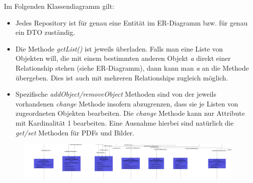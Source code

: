 {Im Folgenden Klassendiagramm gilt:
\begin{itemize}
	\item Jedes Repository ist für genau eine Entität im ER-Diagramm bzw. für genau ein DTO zuständig.
	\item Die Methode \emph{getList()} ist jeweils überladen. Falls man eine Liste von Objekten will, die mit einem bestimmten anderen Objekt \emph{a} direkt einer Relationship stehen (siehe ER-Diagramm), dann kann man \emph{a} an die Methode übergeben. Dies ist auch mit mehreren Relationships zugleich möglich.
	\item Spezifische \emph{addObject/removeObject} Methoden sind von der jeweils vorhandenen \emph{change} Methode insofern abzugrenzen, dass sie je Listen von zugeordneten Objekten bearbeiten. Die \emph{change} Methode kann nur Attribute mit Kardinalität 1 bearbeiten. Eine Ausnahme hierbei sind natürlich die \emph{get/set} Methoden für PDFs und Bilder.
\end{itemize}

\begin{figure}[H]
	\centering
	\includegraphics[width=0.9\linewidth]{graphics/persistence_repository}
\end{figure}


}
